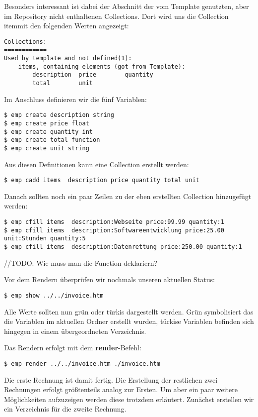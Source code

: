Besonders interessant ist dabei der Abschnitt der vom Template genutzten, aber im Repository nicht enthaltenen Collections. Dort wird uns die Collection \grqq item\grqq mit den folgenden Werten angezeigt:

\begin{lstlisting}[style=Bash]
Collections:
============
Used by template and not defined(1):
	items, containing elements (got from Template):
		description  price        quantity
		total        unit
\end{lstlisting}

Im Anschluss definieren wir die fünf Variablen:
\begin{lstlisting}[style=Bash]
$ emp create description string
$ emp create price float
$ emp create quantity int
$ emp create total function
$ emp create unit string
\end{lstlisting}

Aus diesen Definitionen kann eine Collection erstellt werden:
\begin{lstlisting}[style=Bash]
$ emp cadd items  description price quantity total unit
\end{lstlisting}

Danach sollten noch ein paar Zeilen zu der eben erstellten Collection hinzugefügt werden:
\begin{lstlisting}[style=Bash]
$ emp cfill items  description:Webseite price:99.99 quantity:1
$ emp cfill items  description:Softwareentwicklung price:25.00 unit:Stunden quantity:5
$ emp cfill items  description:Datenrettung price:250.00 quantity:1
\end{lstlisting}
//TODO: Wie muss man die Function deklariern?

Vor dem Rendern überprüfen wir nochmals unseren aktuellen Status:
\begin{lstlisting}[style=Bash]
$ emp show ../../invoice.htm
\end{lstlisting}
Alle Werte sollten nun grün oder türkis dargestellt werden. Grün symbolisiert das die Variablen im aktuellen Ordner erstellt wurden, türkise Variablen befinden sich hingegen in einem übergeordneten Verzeichnis.

Das Rendern erfolgt mit dem \textbf{render}-Befehl:
\begin{lstlisting}[style=Bash]
$ emp render ../../invoice.htm ./invoice.htm
\end{lstlisting}

Die erste Rechnung ist damit fertig. Die Erstellung der restlichen zwei Rechnungen erfolgt größtenteils analog zur Ersten. Um aber ein paar weitere Möglichkeiten aufzuzeigen werden diese trotzdem erläutert.
Zunächst erstellen wir ein Verzeichnis für die zweite Rechnung.

